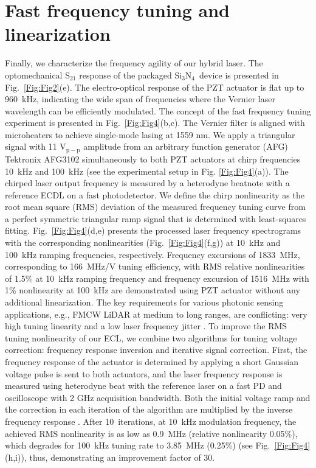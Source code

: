 \documentclass[9pt,twocolumn,twoside, superscriptaddress]{revtex4-2}
\newcommand{\SiN}[0]{Si$_3$N$_4$~}
\begin{document}
\section{Fast frequency tuning and linearization}
Finally, we characterize the frequency agility of our hybrid laser.
The optomechanical S$_{21}$ response of the packaged \SiN device is presented in Fig.~\ref{Fig:Fig2}(e).%
The electro-optical response of the PZT actuator is flat up to 960~kHz, indicating the wide span of frequencies where the Vernier laser wavelength can be efficiently modulated.
The concept of the fast frequency tuning experiment is presented in Fig.~\ref{Fig:Fig4}(b,c).
The Vernier filter is aligned with microheaters to achieve single-mode lasing at 1559 nm.
We apply a triangular signal with 11 V$_\mathrm{p-p}$ amplitude from an arbitrary function generator (AFG) Tektronix AFG3102 simultaneously to both PZT actuators at chirp frequencies 10~kHz and 100~kHz (see the experimental setup in Fig. \ref{Fig:Fig4}(a)).
The chirped laser output frequency is measured by a heterodyne beatnote with a reference ECDL on a fast photodetector. 
We define the chirp nonlinearity as the root mean square (RMS) deviation of the measured frequency tuning curve from a perfect symmetric triangular ramp signal that is determined with least-squares fitting.
Fig.~\ref{Fig:Fig4}(d,e) presents the processed laser frequency spectrograms with the corresponding nonlinearities (Fig.~\ref{Fig:Fig4}(f,g)) at 10~kHz and 100~kHz ramping frequencies, respectively.
Frequency excursions of 1833~MHz, corresponding to 166~MHz/V tuning efficiency, with RMS relative nonlinearities of 1.5\% at 10~kHz ramping frequency and frequency excursion of 1516~MHz with 1\% nonlinearity at 100~kHz are demonstrated using PZT actuator without any additional linearization.
The key requirements for various photonic sensing applications, e.g., FMCW LiDAR at medium to long ranges, are conflicting: very high tuning linearity and a low laser frequency jitter \cite{Behroozpour2017}.
To improve the RMS tuning nonlinearity of our ECL, we combine two algorithms for tuning voltage correction: frequency response inversion and iterative signal correction.
First, the frequency response of the actuator is determined by applying a short Gaussian voltage pulse is sent to both actuators, and the laser frequency response is measured using heterodyne beat with the reference laser on a fast PD and oscilloscope with 2 GHz acquisition bandwidth. 
Both the initial voltage ramp and the correction in each iteration of the algorithm are multiplied by the inverse frequency response \cite{Feneyrou:17}. %
After 10~iterations, at 10~kHz modulation frequency, the achieved RMS nonlinearity is as low as 0.9~MHz (relative nonlinearity 0.05\%), which degrades for 100~kHz tuning rate to 3.85~MHz (0.25\%) (see Fig.~\ref{Fig:Fig4}(h,i)), thus, demonstrating an improvement factor of 30.
\end{document}
